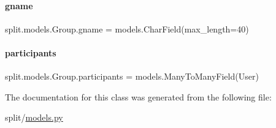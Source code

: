 \paragraph{\texorpdfstring{gname}{gname}}
{\footnotesize\ttfamily split.\+models.\+Group.\+gname = models.\+Char\+Field(max\+\_\+length=40)\hspace{0.3cm}{\ttfamily [static]}}

\mbox{\label{classsplit_1_1models_1_1Group_a42de37203e399e2273ab1d968585d06d}} 
\paragraph{\texorpdfstring{participants}{participants}}
{\footnotesize\ttfamily split.\+models.\+Group.\+participants = models.\+Many\+To\+Many\+Field(User)\hspace{0.3cm}{\ttfamily [static]}}



The documentation for this class was generated from the following file\+:\begin{DoxyCompactItemize}
\item 
split/\hyperlink{split_2models_8py}{models.\+py}\end{DoxyCompactItemize}
